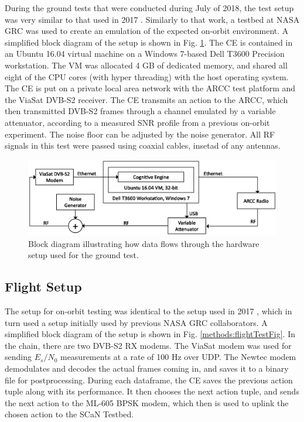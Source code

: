 \par During the ground tests that were conducted during July of 2018, the test setup was very similar to that used in 2017 \cite{tim_implementation}.  Similarly to that work, a testbed at NASA GRC was used to create an emulation of the expected on-orbit environment. A simplified block diagram of the setup is shown in Fig. \ref{methods:groundTestFig}. The CE is contained in an Ubuntu 16.04 virtual machine on a Windows 7-based Dell T3600 Precision workstation. The VM was allocated 4 GB of dedicated memory, and shared all eight of the CPU cores (with hyper threading) with the host operating system. The CE is put on a private local area network with the ARCC test platform and the ViaSat DVB-S2 receiver. The CE transmits an action to the ARCC, which then transmitted DVB-S2 frames through a channel emulated by a variable attenuator, according to a measured SNR profile from a previous on-orbit experiment. The noise floor can be adjusted by the noise generator. All RF signals in this test were passed using coaxial cables, insetad of any antennas.
\begin{figure}[ht]
\includegraphics[width=\textwidth]{figures/test_setups_mod.eps}
\caption{Block diagram illustrating how data flows through the hardware setup used for the ground test.}\label{methods:groundTestFig}
\end{figure} 

\subsection{Flight Setup}
\par The setup for on-orbit testing was identical to the setup used in 2017 \cite{tim_implementation}, which in turn used a setup initially used by previous NASA GRC collaborators. A simplified block diagram of the setup is shown in Fig. \ref{methods:flightTestFig}. In the chain, there are two DVB-S2 RX modems. The ViaSat modem was used for sending $E_s/N_0$ measurements at a rate of 100 Hz over UDP. The Newtec modem demodulates and decodes the actual frames coming in, and saves it to a binary file for postprocessing. During each dataframe, the CE saves the previous action tuple along with its performance. It then chooses the next action tuple, and sends the next action to the ML-605 BPSK modem, which then is used to uplink the chosen action to the SCaN Testbed.

